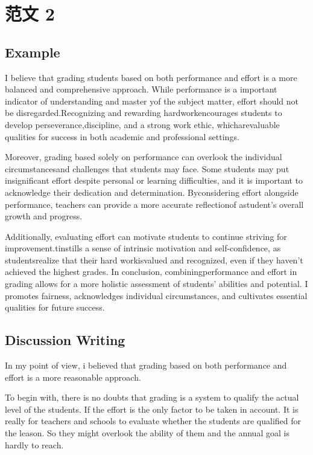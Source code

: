 \section{范文 2}

\subsection{Example}

I believe that grading students based on both performance and effort is a more balanced and comprehensive approach. While performance is a important indicator of understanding and master yof the subject matter, effort should not be disregarded.Recognizing and rewarding hardworkencourages students to develop perseverance,discipline, and a strong work ethic, whicharevaluable qualities for success in both academic and professional settings.

Moreover, grading based solely on performance can overlook the individual circumstancesand challenges that students may face. Some students may put insignificant effort despite personal or learning difficulties, and it is important to acknowledge their dedication and determination. Byconsidering effort alongside performance, teachers can provide a more accurate reflectionof astudent's overall growth and progress.

Additionally, evaluating effort can motivate students to continue striving for improvement.tinstills a sense of intrinsic motivation and self-confidence, as studentsrealize that their hard workisvalued and recognized, even if they haven't achieved the highest grades. In conclusion, combiningperformance and effort in grading allows for a more holistic assessment of students' abilities and potential. I promotes fairness, acknowledges individual circumstances, and cultivates essential
qualities for future success.

\subsection{Discussion Writing}

In my point of view, i believed that grading based on both performance and effort is a more reasonable approach.

To begin with, there is no doubts that grading is a system to qualify the actual level of the students. If the effort is the only factor to be taken in account. It is really for teachers and schools to evaluate whether the students are qualified for the leason. So they might overlook the ability of them and the annual goal is hardly to reach.

